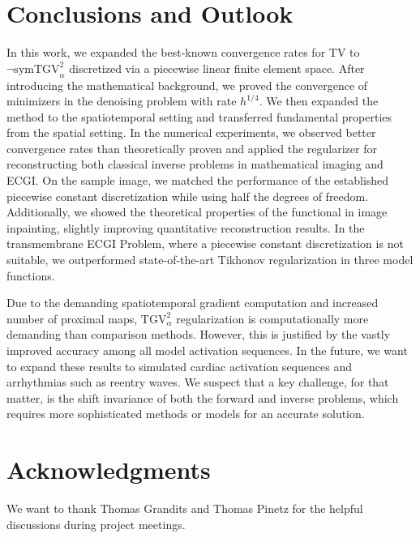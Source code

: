 \documentclass{article}
\newcommand{\TGV}{\mathrm{TGV}}
\newcommand{\NSymTGV}{\neg \mathrm{symTGV}}
\newcommand{\TV}{\mathrm{TV}}
\begin{document}
	\section{Conclusions and Outlook}
	In this work, we expanded the best-known convergence rates for $\TV$ to $\NSymTGV^2_\alpha$ discretized via a piecewise linear finite element space.
	After introducing the mathematical background, we proved the convergence of minimizers in the denoising problem with rate $h^{1/4}$.
	We then expanded the method to the spatiotemporal setting and transferred fundamental properties from the spatial setting.
	In the numerical experiments, we observed better convergence rates than theoretically proven and applied the regularizer for reconstructing both classical inverse problems in mathematical imaging and ECGI.
	On the sample image, we matched the performance of the established piecewise constant discretization while using half the degrees of freedom.
	Additionally, we showed the theoretical properties of the functional in image inpainting, slightly improving quantitative reconstruction results.
	In the transmembrane ECGI Problem, where a piecewise constant discretization is not suitable, we outperformed state-of-the-art Tikhonov regularization in three model functions.
	
	Due to the demanding spatiotemporal gradient computation and increased number of proximal maps, $\TGV^2_\alpha$ regularization is computationally more demanding than comparison methods.
	However, this is justified by the vastly improved accuracy among all model activation sequences.
	In the future, we want to expand these results to simulated cardiac activation sequences and arrhythmias such as reentry waves.
	We suspect that a key challenge, for that matter, is the shift invariance of both the forward and inverse problems, which requires more sophisticated methods or models for an accurate solution.
	
	
	\section*{Acknowledgments}
	We want to thank Thomas Grandits and Thomas Pinetz for the helpful discussions during project meetings.
	\printbibliography
	
\end{document}
